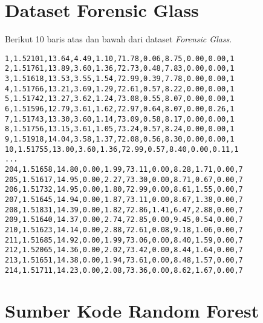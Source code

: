 \newpage
\section{Dataset Forensic Glass}
\label{appendix:dataset_glass}

Berikut 10 baris atas dan bawah dari dataset \textit{Forensic Glass}.

\begin{lstlisting}
1,1.52101,13.64,4.49,1.10,71.78,0.06,8.75,0.00,0.00,1
2,1.51761,13.89,3.60,1.36,72.73,0.48,7.83,0.00,0.00,1
3,1.51618,13.53,3.55,1.54,72.99,0.39,7.78,0.00,0.00,1
4,1.51766,13.21,3.69,1.29,72.61,0.57,8.22,0.00,0.00,1
5,1.51742,13.27,3.62,1.24,73.08,0.55,8.07,0.00,0.00,1
6,1.51596,12.79,3.61,1.62,72.97,0.64,8.07,0.00,0.26,1
7,1.51743,13.30,3.60,1.14,73.09,0.58,8.17,0.00,0.00,1
8,1.51756,13.15,3.61,1.05,73.24,0.57,8.24,0.00,0.00,1
9,1.51918,14.04,3.58,1.37,72.08,0.56,8.30,0.00,0.00,1
10,1.51755,13.00,3.60,1.36,72.99,0.57,8.40,0.00,0.11,1
...
204,1.51658,14.80,0.00,1.99,73.11,0.00,8.28,1.71,0.00,7
205,1.51617,14.95,0.00,2.27,73.30,0.00,8.71,0.67,0.00,7
206,1.51732,14.95,0.00,1.80,72.99,0.00,8.61,1.55,0.00,7
207,1.51645,14.94,0.00,1.87,73.11,0.00,8.67,1.38,0.00,7
208,1.51831,14.39,0.00,1.82,72.86,1.41,6.47,2.88,0.00,7
209,1.51640,14.37,0.00,2.74,72.85,0.00,9.45,0.54,0.00,7
210,1.51623,14.14,0.00,2.88,72.61,0.08,9.18,1.06,0.00,7
211,1.51685,14.92,0.00,1.99,73.06,0.00,8.40,1.59,0.00,7
212,1.52065,14.36,0.00,2.02,73.42,0.00,8.44,1.64,0.00,7
213,1.51651,14.38,0.00,1.94,73.61,0.00,8.48,1.57,0.00,7
214,1.51711,14.23,0.00,2.08,73.36,0.00,8.62,1.67,0.00,7
\end{lstlisting}

\newpage
\section{Sumber Kode Random Forest}
\label{appendix:sumber_kode_randomforest}


